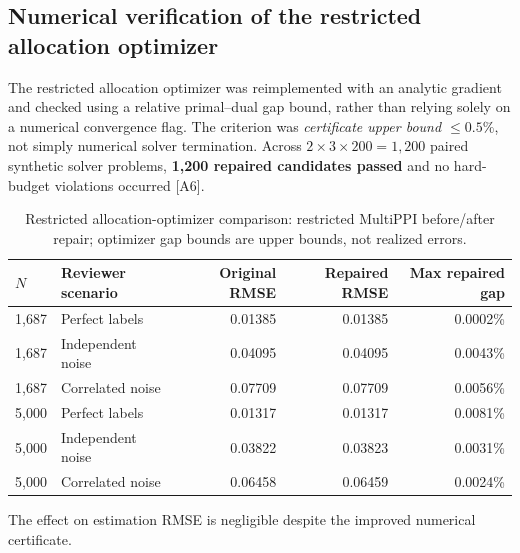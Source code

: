 \documentclass[11pt,a4paper]{article}
\begin{document}
\subsection{Numerical verification of the restricted allocation optimizer}
The restricted allocation optimizer was reimplemented with an analytic gradient and checked using a relative primal--dual gap bound, rather than relying solely on a numerical convergence flag. The criterion was \emph{certificate upper bound $\le0.5\%$}, not simply numerical solver termination. Across $2\times3\times200=1{,}200$ paired synthetic solver problems, \textbf{1,200 repaired candidates passed} and no hard-budget violations occurred [A6].
\begin{table}[H]\centering\small
\caption{Restricted allocation-optimizer comparison: restricted MultiPPI before/after repair; optimizer gap bounds are upper bounds, not realized errors.}
\begin{tabular}{@{}llrrr@{}}\toprule
$N$ & Reviewer scenario & Original RMSE & Repaired RMSE & Max repaired gap\\\midrule
1,687 & Perfect labels & 0.01385 & 0.01385 & 0.0002\% \\
1,687 & Independent noise & 0.04095 & 0.04095 & 0.0043\% \\
1,687 & Correlated noise & 0.07709 & 0.07709 & 0.0056\% \\
5,000 & Perfect labels & 0.01317 & 0.01317 & 0.0081\% \\
5,000 & Independent noise & 0.03822 & 0.03823 & 0.0031\% \\
5,000 & Correlated noise & 0.06458 & 0.06459 & 0.0024\% \\
\bottomrule\end{tabular}
\end{table}
The effect on estimation RMSE is negligible despite the improved numerical certificate.
\end{document}
